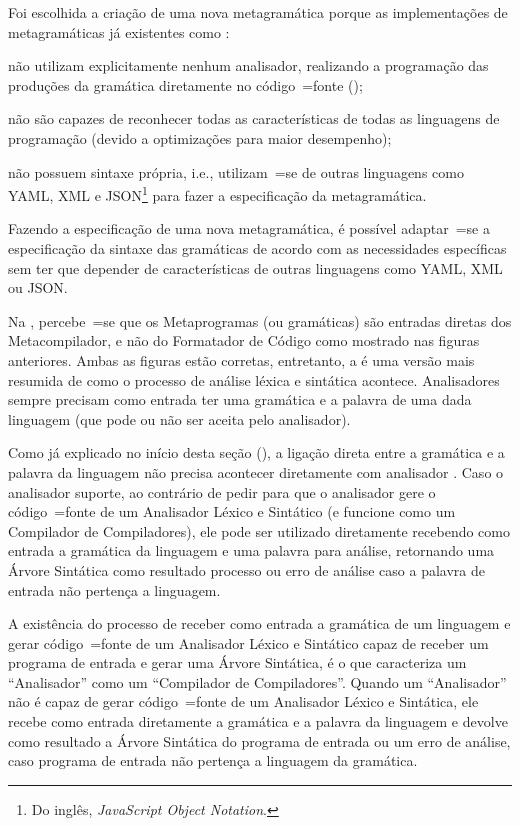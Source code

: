 Foi escolhida a criação de uma nova metagramática porque as implementações de metagramáticas já existentes como :
\begin{inparaenum}[1)]
\item não utilizam explicitamente nenhum analisador,
realizando a programação das produções da gramática diretamente no código~=fonte ();
\item não são capazes de reconhecer todas as características de todas as linguagens de programação (devido a optimizações para maior desempenho);
\item não possuem sintaxe própria,
i.e.,
utilizam~=se de outras linguagens como YAML,
XML e JSON\footnote{%
Do inglês,
\textit{JavaScript Object Notation}.
} \cite{foundationsOfJSONSchema} para fazer a especificação da metagramática.
\end{inparaenum}%
Fazendo a especificação de uma nova metagramática,
é possível adaptar~=se a especificação da sintaxe das gramáticas de acordo com as necessidades específicas sem ter que depender de características de outras linguagens como YAML,
XML ou
JSON.

Na ,
percebe~=se que os Metaprogramas (ou gramáticas) são entradas diretas dos Metacompilador,
e não do Formatador de Código como mostrado nas figuras anteriores.
Ambas as figuras estão corretas,
entretanto,
a  é uma versão mais resumida de como o processo de análise léxica e
sintática acontece.
Analisadores sempre precisam como entrada ter uma gramática e
a palavra de uma dada linguagem (que pode ou
não ser aceita pelo analisador).

Como já explicado no início desta seção (),
a ligação direta entre a gramática e
a palavra da linguagem não precisa acontecer diretamente com analisador .
Caso o analisador suporte,
ao contrário de pedir para que o analisador gere o código~=fonte de um Analisador Léxico e
Sintático (e funcione como um Compilador de Compiladores),
ele pode ser utilizado diretamente recebendo como entrada a gramática da linguagem e
uma palavra para análise,
retornando uma Árvore Sintática como resultado processo ou
erro de análise caso a palavra de entrada não pertença a linguagem.

A existência do processo de receber como entrada a gramática de um linguagem e
gerar código~=fonte de um Analisador Léxico e
Sintático capaz de receber um programa de entrada e
gerar uma Árvore Sintática,
é o que caracteriza um ``Analisador'' como um ``Compilador de Compiladores''.
Quando um ``Analisador'' não é capaz de gerar código~=fonte de um Analisador Léxico e
Sintática,
ele recebe como entrada diretamente a gramática e
a palavra da linguagem e
devolve como resultado a Árvore Sintática do programa de entrada ou
um erro de análise,
caso programa de entrada não pertença a linguagem da gramática.


